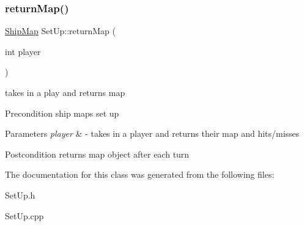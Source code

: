 \subsubsection{\texorpdfstring{return\+Map()}{returnMap()}}
{\footnotesize\ttfamily \hyperlink{classShipMap}{Ship\+Map} Set\+Up\+::return\+Map (\begin{DoxyParamCaption}\item[{int}]{player }\end{DoxyParamCaption})}

takes in a play and returns map

\begin{DoxyPrecond}{Precondition}
ship maps set up 
\end{DoxyPrecond}

\begin{DoxyParams}{Parameters}
{\em player} & -\/ takes in a player and returns their map and hits/misses \\
\hline
\end{DoxyParams}
\begin{DoxyPostcond}{Postcondition}
returns map object after each turn 
\end{DoxyPostcond}


The documentation for this class was generated from the following files\+:\begin{DoxyCompactItemize}
\item 
Set\+Up.\+h\item 
Set\+Up.\+cpp\end{DoxyCompactItemize}
